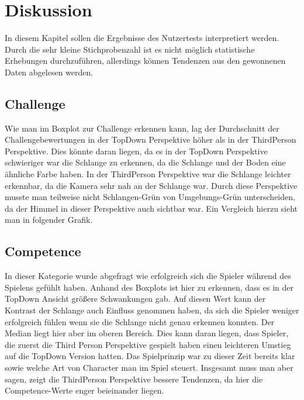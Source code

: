 
\chapter{Diskussion} %
\label{chap:discussion}
In diesem Kapitel sollen die Ergebnisse des Nutzertests interpretiert werden. Durch die sehr kleine Stichprobenzahl ist es nicht möglich statistische Erhebungen durchzuführen, allerdings können Tendenzen aus den gewonnenen Daten abgelesen werden. 
\section{Challenge}
\label{sec:challengeDisk}
Wie man im Boxplot zur Challenge erkennen kann, lag der Durchschnitt der Challengebewertungen in der TopDown Perspektive höher als in der ThirdPerson Perspektive. Dies könnte daran liegen, da es in der TopDown Perspektive schwieriger war die Schlange zu erkennen, da die Schlange und der Boden eine ähnliche Farbe haben. In der ThirdPerson Perspektive war die Schlange leichter erkennbar, da die Kamera sehr nah an der Schlange war. Durch diese Perspektive musste man teilweise nicht Schlangen-Grün von Umgebungs-Grün unterscheiden, da der Himmel in dieser Perspektive auch sichtbar war. Ein Vergleich hierzu sieht man in folgender Grafik.


\section{Competence}
\label{sec:competenceDisk}
In dieser Kategorie wurde abgefragt wie erfolgreich sich die Spieler während des Spielens gefühlt haben. Anhand des Boxplots ist hier zu erkennen, dass es in der TopDown Ansicht größere Schwankungen gab. Auf diesen Wert kann der Kontrast der Schlange auch Einfluss genommen haben, da sich die Spieler weniger erfolgreich fühlen wenn sie die Schlange nicht genau erkennen konnten. Der Median liegt hier aber im oberen Bereich. Dies kann daran liegen, dass Spieler, die zuerst die Third Person Perspektive gespielt haben einen leichteren Umstieg auf die TopDown Version hatten. Das Spielprinzip war zu dieser Zeit bereits klar sowie welche Art von Character man im Spiel steuert. Insgesamt muss man aber sagen, zeigt die ThirdPerson Perspektive bessere Tendenzen, da hier die Competence-Werte enger beieinander liegen.
